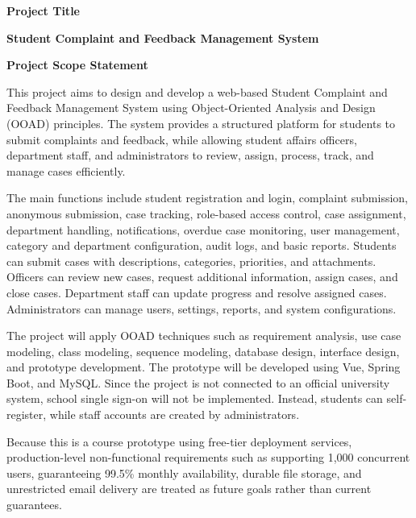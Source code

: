 \documentclass[11pt]{article}
\newcommand{\scfssection}[1]{%
  \vspace{8pt}%
  {\large\bfseries\color{headingblue} #1}\par
  \vspace{2pt}
}
\begin{document}
\scfssection{Project Title}
\textbf{Student Complaint and Feedback Management System}

\scfssection{Project Scope Statement}
This project aims to design and develop a web-based Student Complaint and Feedback Management System using Object-Oriented Analysis and Design (OOAD) principles. The system provides a structured platform for students to submit complaints and feedback, while allowing student affairs officers, department staff, and administrators to review, assign, process, track, and manage cases efficiently.

The main functions include student registration and login, complaint submission, anonymous submission, case tracking, role-based access control, case assignment, department handling, notifications, overdue case monitoring, user management, category and department configuration, audit logs, and basic reports. Students can submit cases with descriptions, categories, priorities, and attachments. Officers can review new cases, request additional information, assign cases, and close cases. Department staff can update progress and resolve assigned cases. Administrators can manage users, settings, reports, and system configurations.

The project will apply OOAD techniques such as requirement analysis, use case modeling, class modeling, sequence modeling, database design, interface design, and prototype development. The prototype will be developed using Vue, Spring Boot, and MySQL. Since the project is not connected to an official university system, school single sign-on will not be implemented. Instead, students can self-register, while staff accounts are created by administrators.

Because this is a course prototype using free-tier deployment services, production-level non-functional requirements such as supporting 1,000 concurrent users, guaranteeing 99.5\% monthly availability, durable file storage, and unrestricted email delivery are treated as future goals rather than current guarantees.
\end{document}
